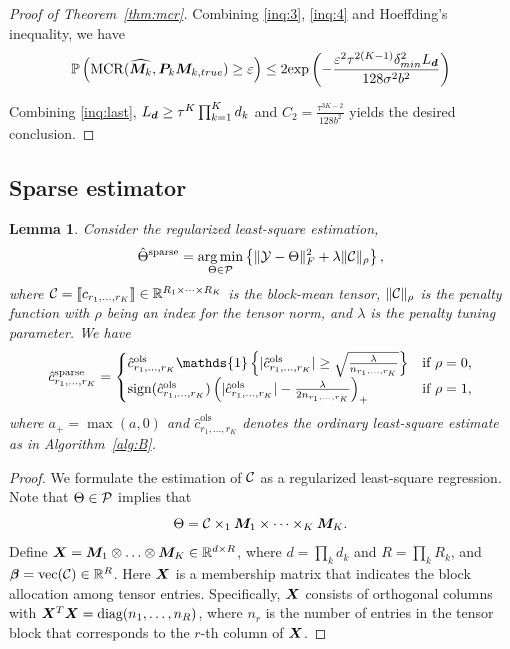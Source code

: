 \documentclass{article}
\newtheorem{lemma}{Lemma}
\DeclareMathOperator*{\mcr}{MCR}
\begin{document}
\begin{appendices}
\begin{proof}[Proof of Theorem~\ref{thm:mcr}]
Combining \eqref{inq:3}, \eqref{inq:4} and  Hoeffding's inequality, we have
\begin{equation}\label{inq:last}
\mathbb{P}\left(\mcr(\widehat{\mM_k}, \mP_k\mM_{k,true})\geq \varepsilon\right)
\leq 2 \text{exp}\left( -\frac{\varepsilon^2\tau^{2(K-1)}\delta_{min}^2L_{\md}}{128\sigma^2b^2} \right)
\end{equation}

Combining \eqref{inq:last}, $L_{\bm{d}}\geq \tau^K\prod_{k=1}^Kd_k$ and $C_2=\frac{\tau^{3K-2}}{128b^2}$ yields the desired conclusion.


\end{proof}



\subsection{Sparse estimator}
\begin{lemma}\label{prop:sparse}
Consider the regularized least-square estimation,
\begin{equation}\label{eq:opt}
\hat \Theta^{\text{sparse}}=\operatorname*{arg\,min}_{\Theta\in \mathcal{P}}\left\{\lVert\mathcal{Y}-\Theta\rVert_F^2+\lambda \lVert\mathcal{C}\rVert_\rho
\right\},
\end{equation}
where $\mathcal{C}=\llbracket c_{r_1,\ldots,r_K} \rrbracket\in\mathbb{R}^{R_1\times \cdots\times R_K}$ is the block-mean tensor, $\lVert\mathcal{C}\rVert_\rho$ is the penalty function with $\rho$ being an index for the tensor norm, and $\lambda$ is the penalty tuning parameter. We have
\begin{equation}\label{eq:lasso}
\hat c^{\text{sparse}}_{r_1,\ldots,r_K}=
\begin{cases}
\hat c^{\text{ols}}_{r_1,\ldots,r_K}\mathds{1}\left\{|\hat c^{\text{ols}}_{r_1,\ldots,r_K} |\geq {\sqrt{\lambda \over n_{r_1,\ldots,r_K}}}\right\} & \text{if}\ \rho=0,\\
\text{sign}(\hat c^{\text{ols}}_{r_1,\ldots,r_K})\left( |\hat c^{\text{ols}}_{r_1,\ldots,r_K}|-{\lambda \over 2n_{r_1,\ldots,r_K}}  \right)_{+} &\text{if}\ \rho=1,
\end{cases}
\end{equation}
where $a_{+}=\max(a,0)$ and $\hat c^{\text{ols}}_{r_1,\ldots,r_K}$ denotes the ordinary least-square estimate as in Algorithm~\ref{alg:B}. 
\end{lemma}

\begin{proof}
We formulate the estimation of $\mathcal{C}$ as a regularized least-square regression. Note that $\Theta\in\mathcal{P}$ implies that
\[
\Theta=\mathcal{C}\times_1\boldsymbol{M}_1\times \cdots \times_K \boldsymbol{M}_K.
\]
Define $\bm X=\boldsymbol{M}_1\otimes \ldots \otimes \boldsymbol{M}_K\in \mathbb{R}^{d\times R}$, where $d=\prod_k d_k$ and $R=\prod_k R_k$, and ${\bm \beta}=\text{vec}(\mathcal{C})\in\mathbb{R}^R$. Here $\bm X$ is a membership matrix that indicates the block allocation among tensor entries. Specifically, $\bm X$ consists of orthogonal columns with $\bm X^T\bm X=\text{diag}(n_1,\ldots,n_R)$, where $n_r$ is the number of entries in the tensor block that corresponds to the $r$-th column of $\bm X$.


\end{proof}
\end{appendices}
\end{document}
